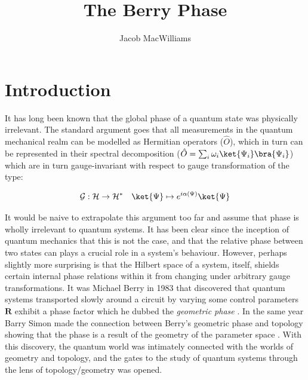 \documentclass{article}
\title{The Berry Phase}
\author{Jacob MacWilliams}
\begin{document}
\maketitle
\tableofcontents

\newpage
\section{Introduction \label{sec:intro}}

It has long been known that the global phase of a quantum state was physically irrelevant. The standard argument goes that all measurements in the quantum mechanical realm can be modelled as Hermitian operators ($\hat{O}$), which in turn can be represented in their spectral decomposition ($\hat{O} = \sum_{i} \omega_{i}\ket{\Psi_i}\bra{\Psi_i}$) which are in turn gauge-invariant with respect to gauge transformation of the type:

\begin{equation*}
  \mathcal{G}: \mathcal{H} \rightarrow \mathcal{H}^{*} \quad  \ket{\Psi} \mapsto e^{i\alpha(\Psi)}\ket{\Psi}
\end{equation*}

It would be naive to extrapolate this argument too far and assume that phase is wholly irrelevant to quantum systems. It has been clear since the inception of quantum mechanics that this is not the case, and that the relative phase between two states can plays a crucial role in a system's behaviour. However, perhaps slightly more surprising is that the Hilbert space of a system, itself, shields certain internal phase relations within it from changing under arbitrary gauge transformations. It was Michael Berry in 1983 that discovered that quantum systems transported slowly around a circuit by varying some control parameters $\bm{R}$ exhibit a phase factor which he dubbed the \textit{geometric phase} \cite{Berry1984}. In the same year Barry Simon made the connection between Berry's geometric phase and topology showing that the phase is a result of the geometry of the parameter space \cite{Simon1983}. With this discovery, the quantum world was intimately connected with the worlds of geometry and topology, and the gates to the study of quantum systems through the lens of topology/geometry was opened.\\
\end{document}
